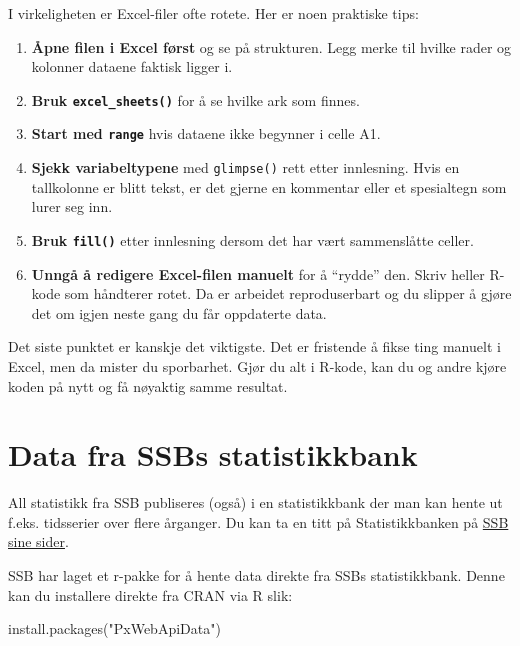\documentclass[
  norsk,
  letterpaper,
  DIV=11,
  numbers=noendperiod]{scrreprt}
\newenvironment{Shaded}{\begin{snugshade}}{\end{snugshade}}
\newcommand{\FunctionTok}[1]{\textcolor[rgb]{0.28,0.35,0.67}{#1}}
\newcommand{\NormalTok}[1]{\textcolor[rgb]{0.00,0.23,0.31}{#1}}
\newcommand{\StringTok}[1]{\textcolor[rgb]{0.13,0.47,0.30}{#1}}
\providecommand{\tightlist}{%
  \setlength{\itemsep}{0pt}\setlength{\parskip}{0pt}}
\theoremstyle{definition}
\theoremstyle{remark}
\begin{document}
I virkeligheten er Excel-filer ofte rotete. Her er noen praktiske tips:

\begin{enumerate}
\def\labelenumi{\arabic{enumi}.}
\tightlist
\item
  \textbf{Åpne filen i Excel først} og se på strukturen. Legg merke til
  hvilke rader og kolonner dataene faktisk ligger i.
\item
  \textbf{Bruk \texttt{excel\_sheets()}} for å se hvilke ark som finnes.
\item
  \textbf{Start med \texttt{range}} hvis dataene ikke begynner i celle
  A1.
\item
  \textbf{Sjekk variabeltypene} med \texttt{glimpse()} rett etter
  innlesning. Hvis en tallkolonne er blitt tekst, er det gjerne en
  kommentar eller et spesialtegn som lurer seg inn.
\item
  \textbf{Bruk \texttt{fill()}} etter innlesning dersom det har vært
  sammenslåtte celler.
\item
  \textbf{Unngå å redigere Excel-filen manuelt} for å ``rydde'' den.
  Skriv heller R-kode som håndterer rotet. Da er arbeidet reproduserbart
  og du slipper å gjøre det om igjen neste gang du får oppdaterte data.
\end{enumerate}

Det siste punktet er kanskje det viktigste. Det er fristende å fikse
ting manuelt i Excel, men da mister du sporbarhet. Gjør du alt i R-kode,
kan du og andre kjøre koden på nytt og få nøyaktig samme resultat.

\chapter{Data fra SSBs
statistikkbank}\label{data-fra-ssbs-statistikkbank}

All statistikk fra SSB publiseres (også) i en statistikkbank der man kan
hente ut f.eks. tidsserier over flere årganger. Du kan ta en titt på
Statistikkbanken på \href{https://www.ssb.no/statbank}{SSB sine sider}.

SSB har laget et r-pakke for å hente data direkte fra SSBs
statistikkbank. Denne kan du installere direkte fra CRAN via R slik:

\begin{Shaded}
\begin{Highlighting}[]
\FunctionTok{install.packages}\NormalTok{(}\StringTok{"PxWebApiData"}\NormalTok{)}
\end{Highlighting}
\end{Shaded}
\end{document}
